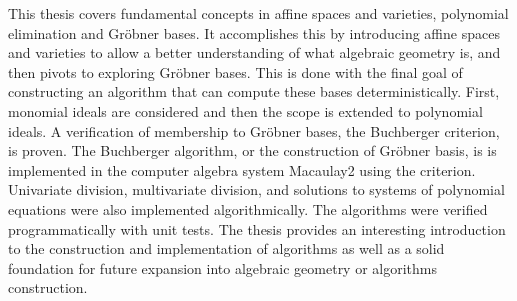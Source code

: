This thesis covers fundamental concepts in affine spaces and varieties, polynomial elimination and Gröbner bases. It accomplishes this by introducing affine spaces and varieties to allow a better understanding of what algebraic geometry is, and then pivots to exploring Gröbner bases. This is done with the final goal of constructing an algorithm that can compute these bases deterministically. First, monomial ideals are considered and then the scope is extended to polynomial ideals. A verification of membership to Gröbner bases, the Buchberger criterion, is proven. The Buchberger algorithm, or the construction of Gröbner basis, is is implemented in the computer algebra system Macaulay2 using the criterion. Univariate division, multivariate division, and solutions to systems of polynomial equations were also implemented algorithmically. The algorithms were verified programmatically with unit tests. The thesis provides an interesting introduction to the construction and implementation of algorithms as well as a solid foundation for future expansion into algebraic geometry or algorithms construction. 

